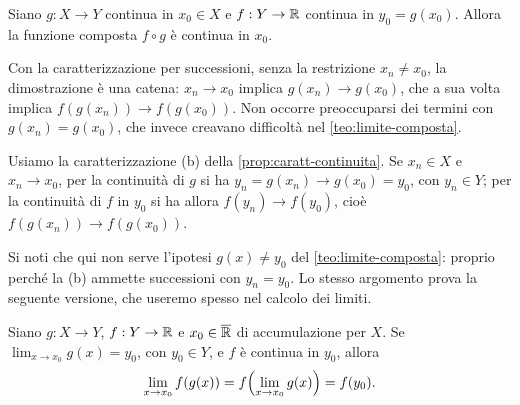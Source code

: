 \begin{teorema}\label{teo:composta-continua}
Siano $g:X\to Y$ continua in $x_{0}\in X$ e $f:Y\to\mathbb{R}$ continua in $y_{0}=g(x_{0})$.
Allora la funzione composta $f\circ g$ è continua in $x_{0}$.
\end{teorema}

\begin{schema}
\end{schema}

\begin{strategia}
Con la caratterizzazione per successioni, senza la restrizione $x_{n}\neq x_{0}$, la
dimostrazione è una catena: $x_{n}\to x_{0}$ implica $g(x_{n})\to g(x_{0})$, che a sua
volta implica $f(g(x_{n}))\to f(g(x_{0}))$. Non occorre preoccuparsi dei termini con
$g(x_{n})=g(x_{0})$, che invece creavano difficoltà nel \cref{teo:limite-composta}.
\end{strategia}

\begin{dimostrazione}
Usiamo la caratterizzazione (b) della \cref{prop:caratt-continuita}. Se $x_{n}\in X$ e
$x_{n}\to x_{0}$, per la continuità di $g$ si ha $y_{n}=g(x_{n})\to g(x_{0})=y_{0}$, con
$y_{n}\in Y$; per la continuità di $f$ in $y_{0}$ si ha allora $f(y_{n})\to f(y_{0})$,
cioè $f(g(x_{n}))\to f(g(x_{0}))$.
\end{dimostrazione}

Si noti che qui non serve l'ipotesi $g(x)\neq y_{0}$ del \cref{teo:limite-composta}:
proprio perché la (b) ammette successioni con $y_{n}=y_{0}$. Lo stesso argomento prova
la seguente versione, che useremo spesso nel calcolo dei limiti.

\begin{corollario}\label{cor:limite-composta-continua}
Siano $g:X\to Y$, $f:Y\to\mathbb{R}$ e $x_{0}\in\overline{\mathbb{R}}$ di accumulazione per $X$. Se
$\lim_{x\to x_{0}}g(x)=y_{0}$, con $y_{0}\in Y$, e $f$ è continua in $y_{0}$, allora
\begin{equation}\label{eq:limite-composta-continua}
  \lim_{x\to x_{0}}f(g(x))=f\Bigl(\lim_{x\to x_{0}}g(x)\Bigr)=f(y_{0}) .
\end{equation}
\end{corollario}

\begin{schema}
\end{schema}

